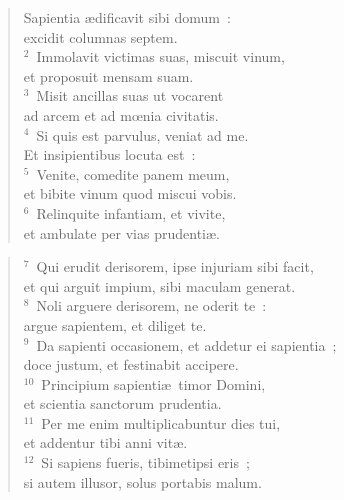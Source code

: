 \begin{flushleft}\begin{verse}\vspace{-19pt}Sapientia \ae dificavit sibi domum~:\\ excidit columnas septem.\\
${}^{2}$~Immolavit victimas suas, miscuit vinum,\\ et proposuit mensam suam.\\
${}^{3}$~Misit ancillas suas ut vocarent\\ ad arcem et ad mœnia civitatis.\\
${}^{4}$~Si quis est parvulus, veniat ad me.\\ Et insipientibus locuta est~:\\
${}^{5}$~Venite, comedite panem meum,\\ et bibite vinum quod miscui vobis.\\
${}^{6}$~Relinquite infantiam, et vivite,\\ et ambulate per vias prudenti\ae .\end{verse}\end{flushleft}


\begin{flushleft}\begin{verse}${}^{7}$~Qui erudit derisorem, ipse injuriam sibi facit,\\ et qui arguit impium, sibi maculam generat.\\
${}^{8}$~Noli arguere derisorem, ne oderit te~:\\ argue sapientem, et diliget te.\\
${}^{9}$~Da sapienti occasionem, et addetur ei sapientia~;\\ doce justum, et festinabit accipere.\\
${}^{10}$~Principium sapienti\ae\ timor Domini,\\ et scientia sanctorum prudentia.\\
${}^{11}$~Per me enim multiplicabuntur dies tui,\\ et addentur tibi anni vit\ae .\\
${}^{12}$~Si sapiens fueris, tibimetipsi eris~;\\ si autem illusor, solus portabis malum.\end{verse}\end{flushleft}


